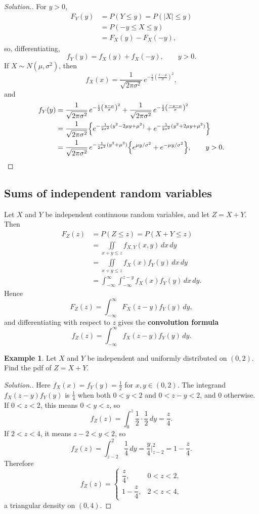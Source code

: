 \documentclass[11pt,a4paper]{article}
\theoremstyle{definition}
\newtheorem{exa}[thm]{Example}
\newenvironment{solution}
  {\renewcommand{\qedsymbol}{}\begin{proof}[\textit{Solution}.]}
  {\end{proof}}
\begin{document}
\begin{solution}
For $y > 0$,
\begin{align*}
F_Y(y) &= P(Y \le y) = P(|X| \le y) \\
&= P(-y \le X \le y) \\
&= F_X(y) - F_X(-y) ,
\end{align*}
so, differentiating,
\[
f_Y(y) = f_X(y) + f_X(-y) , \qquad y > 0 .
\]
If $X \sim N(\mu, \sigma^2)$, then
\[
f_X(x) = \frac{1}{\sqrt{2\pi\sigma^2}}\,e^{-\frac12\left(\frac{x-\mu}{\sigma}\right)^2} ,
\]
and
\begin{align*}
f_Y(y) &= \frac{1}{\sqrt{2\pi\sigma^2}}\,e^{-\frac12\left(\frac{y-\mu}{\sigma}\right)^2} + \frac{1}{\sqrt{2\pi\sigma^2}}\,e^{-\frac12\left(\frac{-y-\mu}{\sigma}\right)^2} \\
&= \frac{1}{\sqrt{2\pi\sigma^2}}\Bigl\{e^{-\frac{1}{2\sigma^2}(y^2 - 2\mu y + \mu^2)} + e^{-\frac{1}{2\sigma^2}(y^2 + 2\mu y + \mu^2)}\Bigr\} \\
&= \frac{1}{\sqrt{2\pi\sigma^2}}\,e^{-\frac{1}{2\sigma^2}(y^2 + \mu^2)}\Bigl\{e^{\mu y/\sigma^2} + e^{-\mu y/\sigma^2}\Bigr\} , \qquad y > 0 .
\end{align*}
\end{solution}

\subsection{Sums of independent random variables}
Let $X$ and $Y$ be independent continuous random variables, and let $Z = X + Y$. Then
\begin{align*}
F_Z(z) &= P(Z \le z) = P(X + Y \le z) \\
&= \iint\limits_{x+y\le z}f_{X,Y}(x, y)\,dx\,dy \\
&= \iint\limits_{x+y\le z}f_X(x)f_Y(y)\,dx\,dy \\
&= \int_{-\infty}^{\infty}\int_{-\infty}^{z-y}f_X(x)f_Y(y)\,dx\,dy .
\end{align*}
Hence
\[
F_Z(z) = \int_{-\infty}^{\infty}F_X(z - y)f_Y(y)\,dy ,
\]
and differentiating with respect to $z$ gives the \textbf{convolution formula}
\[
f_Z(z) = \int_{-\infty}^{\infty}f_X(z - y)f_Y(y)\,dy .
\]

\begin{exa}\label{exa:uniform-sum}
Let $X$ and $Y$ be independent and uniformly distributed on $(0, 2)$. Find the pdf of $Z = X + Y$.
\end{exa}

\begin{solution}
Here $f_X(x) = f_Y(y) = \frac12$ for $x, y \in (0, 2)$. The integrand $f_X(z - y)f_Y(y)$ is $\frac14$ when both $0 < y < 2$ and $0 < z - y < 2$, and $0$
otherwise. If $0 < z < 2$, this means $0 < y < z$, so
\[
f_Z(z) = \int_0^z\frac12\cdot\frac12\,dy = \frac z4 .
\]
If $2 < z < 4$, it means $z - 2 < y < 2$, so
\[
f_Z(z) = \int_{z-2}^2\frac14\,dy = \frac y4\Big|_{z-2}^2 = 1 - \frac z4 .
\]
Therefore
\[
f_Z(z) = \begin{cases} \dfrac z4 , & 0 < z < 2 , \\[1ex] 1 - \dfrac z4 , & 2 < z < 4 , \end{cases}
\]
a triangular density on $(0, 4)$.
\end{solution}
\end{document}
